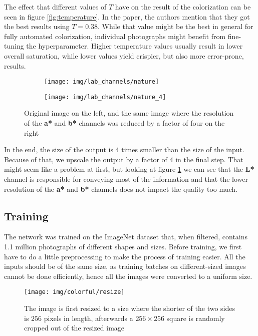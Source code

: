 The effect that different values of $T$ have on the result of the colorization
can be seen in figure \ref{fig:temperature}. In the paper, the authors mention
that they got the best results using $T=0.38$. While that value might be the best
in general for fully automated colorization, individual photographs might benefit
from fine-tuning the hyperparameter. Higher temperature values usually result in 
lower overall saturation, while lower values yield crispier, but also more error-prone, results.

\begin{figure}[!ht]
	\centering
	\begin{subfigure}{.49\textwidth}
		\centering
		\texttt{[image: img/lab\_channels/nature]}
	\end{subfigure}
	\begin{subfigure}{.49\textwidth}
		\centering
		\texttt{[image: img/lab\_channels/nature\_4]}
	\end{subfigure}
    \caption{Original image on the left, and the same image where the resolution of the \textbf{a*} and \textbf{b*} channels was reduced by a factor of four on the right}
	\label{fig:color4}
\end{figure}

In the end, the size of the output is 4 times smaller than the size of the input. 
Because of that, we upscale the output by a factor of 4 in the final step. That might
seem like a problem at first, but looking at figure \ref{fig:color4} we can see
that the \textbf{L*} channel is responsible for conveying most of the information and
that the lower resolution of the \textbf{a*} and \textbf{b*} channels does not impact
the quality too much.

\subsection{Training}
\label{sec:colorful_training}

The network was trained on the ImageNet dataset that, when filtered, contains
1.1 million photographs of different shapes and sizes. Before training, we first
have to do a little preprocessing to make the process of training easier. All the inputs
should be of the same size, as training batches on 
different-sized images cannot be done efficiently, hence all the images were 
converted to a uniform size. 

\begin{figure}[!ht]
	\centering
	\texttt{[image: img/colorful/resize]}
    \caption{
	The image is first resized to a size where the shorter of the two sides
	is $256$ pixels in length, afterwards a $256\times256$ square is 
	randomly cropped out of the resized image}
	\label{fig:crop}
\end{figure}

